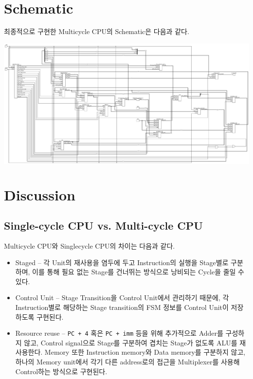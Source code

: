 \documentclass{scrartcl}
\begin{document}
\section{Schematic}
최종적으로 구현한 Multicycle CPU의 Schematic은 다음과 같다.

\includegraphics[angle=90,scale=0.35]{schematic.pdf}

\section{Discussion}

\subsection{Single-cycle CPU vs. Multi-cycle CPU}
Multicycle CPU와 Singlecycle CPU의 차이는 다음과 같다.
\begin{itemize}
  \item Staged -- 각 Unit의 재사용을 염두에 두고 Instruction의 실행을 Stage별로 구분하며, 이를 통해 필요 없는 Stage를 건너뛰는 방식으로 낭비되는 Cycle을 줄일 수 있다.
  \item Control Unit -- Stage Transition을 Control Unit에서 관리하기 때문에, 각 Instruction별로 해당하는 Stage transition의 FSM 정보를 Control Unit이 저장하도록 구현된다.
  \item Resource reuse -- \texttt{PC + 4} 혹은 \texttt{PC + imm} 등을 위해 추가적으로 Adder를 구성하지 않고, Control signal으로 Stage를 구분하여 겹치는 Stage가 없도록 ALU를 재사용한다.
  Memory 또한 Instruction memory와 Data memory를 구분하지 않고, 하나의 Memory unit에서 각기 다른 address로의 접근을 Multiplexer를 사용해 Control하는 방식으로 구현된다.
\end{itemize}
\end{document}
